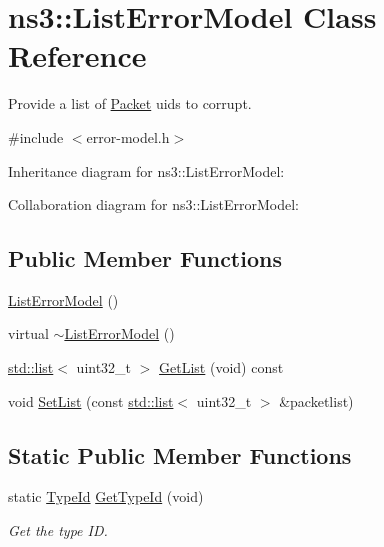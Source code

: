 \hypertarget{classns3_1_1ListErrorModel}{}\section{ns3\+:\+:List\+Error\+Model Class Reference}
\label{classns3_1_1ListErrorModel}


Provide a list of \hyperlink{classns3_1_1Packet}{Packet} uids to corrupt.  




{\ttfamily \#include $<$error-\/model.\+h$>$}



Inheritance diagram for ns3\+:\+:List\+Error\+Model\+:


Collaboration diagram for ns3\+:\+:List\+Error\+Model\+:
\subsection*{Public Member Functions}
\begin{DoxyCompactItemize}
\item 
\hyperlink{classns3_1_1ListErrorModel_a7e45ced13e96196ae489e466d0b0819b}{List\+Error\+Model} ()
\item 
virtual \hyperlink{classns3_1_1ListErrorModel_a3d9520725571d8465ad5568a911ab576}{$\sim$\+List\+Error\+Model} ()
\item 
\hyperlink{openflow-interface_8h_afd9bcfa176617760671b67580f536fa7}{std\+::list}$<$ uint32\+\_\+t $>$ \hyperlink{classns3_1_1ListErrorModel_ae8d5d1411670cbb844563c7a30094446}{Get\+List} (void) const 
\item 
void \hyperlink{classns3_1_1ListErrorModel_a4b369305572461e7122a2408c0123ac4}{Set\+List} (const \hyperlink{openflow-interface_8h_afd9bcfa176617760671b67580f536fa7}{std\+::list}$<$ uint32\+\_\+t $>$ \&packetlist)
\end{DoxyCompactItemize}
\subsection*{Static Public Member Functions}
\begin{DoxyCompactItemize}
\item 
static \hyperlink{classns3_1_1TypeId}{Type\+Id} \hyperlink{classns3_1_1ListErrorModel_ab97f27214f9d03e076de4fb90c2d125c}{Get\+Type\+Id} (void)
\begin{DoxyCompactList}\small\item\em Get the type ID. \end{DoxyCompactList}\end{DoxyCompactItemize}
